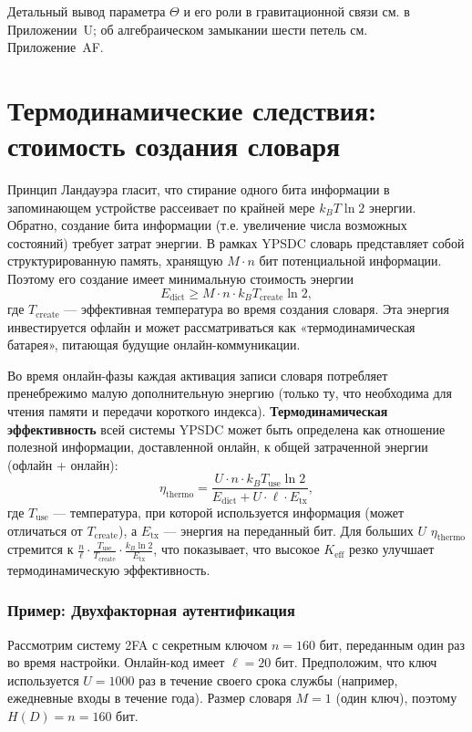 \documentclass[12pt,a4paper]{article}
\theoremstyle{remark}
\newcommand{\Keff}{K_{\mathrm{eff}}}
\begin{document}
	Детальный вывод параметра \(\Theta\) и его роли в гравитационной связи см. в Приложении~U; об алгебраическом замыкании шести петель см. Приложение~AF.
	
	\section{Термодинамические следствия: стоимость создания словаря}
	\label{sec:thermo}
	
	Принцип Ландауэра \cite{Landauer1961} гласит, что стирание одного бита информации в запоминающем устройстве рассеивает по крайней мере $k_B T \ln 2$ энергии. Обратно, создание бита информации (т.е. увеличение числа возможных состояний) требует затрат энергии. В рамках YPSDC словарь представляет собой структурированную память, хранящую $M \cdot n$ бит потенциальной информации. Поэтому его создание имеет минимальную стоимость энергии
	\begin{equation}
		E_{\text{dict}} \ge M \cdot n \cdot k_B T_{\text{create}} \ln 2, \label{eq:thermo-cost}
	\end{equation}
	где $T_{\text{create}}$ — эффективная температура во время создания словаря. Эта энергия инвестируется офлайн и может рассматриваться как «термодинамическая батарея», питающая будущие онлайн-коммуникации.
	
	Во время онлайн-фазы каждая активация записи словаря потребляет пренебрежимо малую дополнительную энергию (только ту, что необходима для чтения памяти и передачи короткого индекса). \textbf{Термодинамическая эффективность} всей системы YPSDC может быть определена как отношение полезной информации, доставленной онлайн, к общей затраченной энергии (офлайн + онлайн):
	\begin{equation}
		\eta_{\text{thermo}} = \frac{U \cdot n \cdot k_B T_{\text{use}} \ln 2}{E_{\text{dict}} + U \cdot \ell \cdot E_{\text{tx}}}, \label{eq:thermo}
	\end{equation}
	где $T_{\text{use}}$ — температура, при которой используется информация (может отличаться от $T_{\text{create}}$), а $E_{\text{tx}}$ — энергия на переданный бит. Для больших $U$ $\eta_{\text{thermo}}$ стремится к $\frac{n}{\ell} \cdot \frac{T_{\text{use}}}{T_{\text{create}}} \cdot \frac{k_B \ln 2}{E_{\text{tx}}}$, что показывает, что высокое $\Keff$ резко улучшает термодинамическую эффективность.
	
	\subsubsection{Пример: Двухфакторная аутентификация}
	Рассмотрим систему 2FA с секретным ключом $n = 160$ бит, переданным один раз во время настройки. Онлайн-код имеет $\ell = 20$ бит. Предположим, что ключ используется $U = 1000$ раз в течение своего срока службы (например, ежедневные входы в течение года). Размер словаря $M = 1$ (один ключ), поэтому $H(D) = n = 160$ бит.
	
\end{document}

